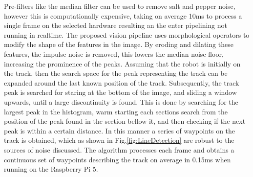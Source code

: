         Pre-filters like the median filter can be used to remove salt and pepper noise, however this is computationally expensive, taking on average 10ms
        to process a single frame on the selected hardware resulting an the enter pipelining not running in realtime. 
        The proposed vision pipeline uses morphological operators to modify the shape of the features in the image.
        By eroding and dilating these features, the impulse noise is removed, this lowers the median noise floor, increasing the prominence of the peaks. 
        Assuming that the robot is initially on the track, then the search space for the peak representing the track can be expanded around the last
        known position of the track. Subsequently, the track peak is searched for staring at the bottom of the image, and sliding a window upwards, 
        until a large discontinuity is found. This is done by searching for the largest peak in the histogram, warm starting each sections search from the position 
        of the peak found in the section bellow it, and then checking if the next peak is within a certain distance. In this manner
        a series of waypoints on the track is obtained, which as shown in Fig.\ref{fig:LineDetection} are robust to the sources of noise discussed. 
        The algorithm processes each frame and obtains a continuous set of waypoints describing the track on average in 0.15ms when running on the Raspberry Pi 5.
